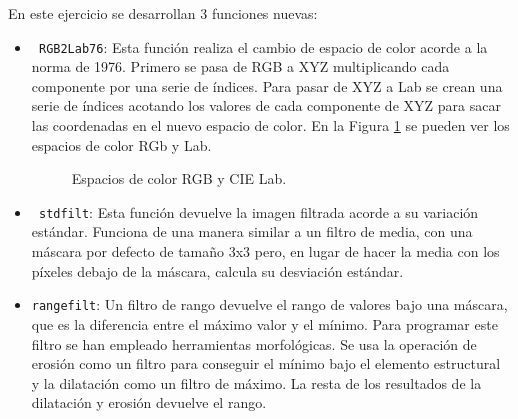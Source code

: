 \documentclass[a4paper,12pt]{report}
\begin{document}
En este ejercicio se desarrollan 3 funciones nuevas:
\begin{itemize}

	\item \texttt{ RGB2Lab76}: Esta función realiza el cambio de espacio de color acorde a la norma de 1976. Primero se pasa de RGB a XYZ multiplicando cada componente por una serie de índices. Para pasar de XYZ a Lab se crean una serie de índices acotando los valores de cada componente de XYZ para sacar las coordenadas en el nuevo espacio de color. En la Figura \ref{colorspaces} se pueden ver los espacios de color RGb y Lab.
\begin{figure}[!tbp]
  \centering
  \hfill
  \caption{Espacios de color RGB y CIE Lab.}
  \label{colorspaces}
\end{figure}

	\item \texttt{ stdfilt}: Esta función devuelve la imagen filtrada acorde a su variación estándar. Funciona de una manera similar a un filtro de media, con una máscara por defecto de tamaño 3x3 pero, en lugar de hacer la media con los píxeles debajo de la máscara, calcula su desviación estándar.

	\item \texttt{rangefilt}: Un filtro de rango devuelve el rango de valores bajo una máscara, que es la diferencia entre el máximo valor y el mínimo. Para programar este filtro se han empleado herramientas morfológicas. Se usa la operación de erosión como un filtro para conseguir el mínimo bajo el elemento estructural y la dilatación como un filtro de máximo. La resta de los resultados de la dilatación y erosión devuelve el rango.\\
\end{itemize}
\end{document}
